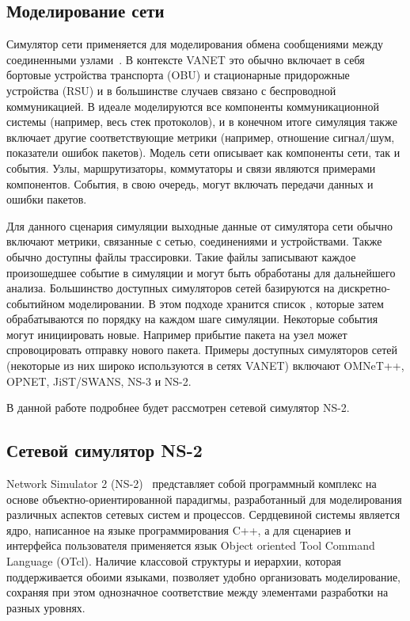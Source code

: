 \subsection{Моделирование сети}

Симулятор сети применяется для моделирования обмена сообщениями между соединенными узлами~\cite{aljabry2021survey}. В контексте VANET это обычно включает в себя бортовые устройства транспорта (OBU) и стационарные придорожные устройства (RSU) и в большинстве случаев связано с беспроводной коммуникацией. В идеале моделируются все компоненты коммуникационной системы (например, весь стек протоколов), и в конечном итоге симуляция также включает другие соответствующие метрики (например, отношение сигнал/шум, показатели ошибок пакетов). Модель сети описывает как компоненты сети, так и события. Узлы, маршрутизаторы, коммутаторы и связи являются примерами компонентов. События, в свою очередь, могут включать передачи данных и ошибки пакетов.

Для данного сценария симуляции выходные данные от симулятора сети обычно включают метрики, связанные с сетью, соединениями и устройствами. Также обычно доступны файлы трассировки. Такие файлы записывают каждое произошедшее событие в симуляции и могут быть обработаны для дальнейшего анализа. Большинство доступных симуляторов сетей базируются на дискретно-событийном моделировании. В этом подходе хранится список , которые затем обрабатываются по порядку на каждом шаге симуляции. Некоторые события могут инициировать новые. Например прибытие пакета на узел может спровоцировать отправку нового пакета. Примеры доступных симуляторов сетей (некоторые из них широко используются в сетях VANET) включают OMNeT++, OPNET, JiST/SWANS, NS-3 и NS-2.

В данной работе подробнее будет рассмотрен сетевой симулятор NS-2.

\subsection{Сетевой симулятор NS-2}

Network Simulator 2 (NS-2)~\cite{issariyakul2009introduction,mahrenholz2004real} представляет собой программный комплекс на основе объектно-ориентированной парадигмы, разработанный для моделирования различных аспектов сетевых систем и процессов. Сердцевиной системы является ядро, написанное на языке программирования C++, а для сценариев и интерфейса пользователя применяется язык Object oriented Tool Command Language (OTcl). Наличие классовой структуры и иерархии, которая поддерживается обоими языками, позволяет удобно организовать моделирование, сохраняя при этом однозначное соответствие между элементами разработки на разных уровнях.

